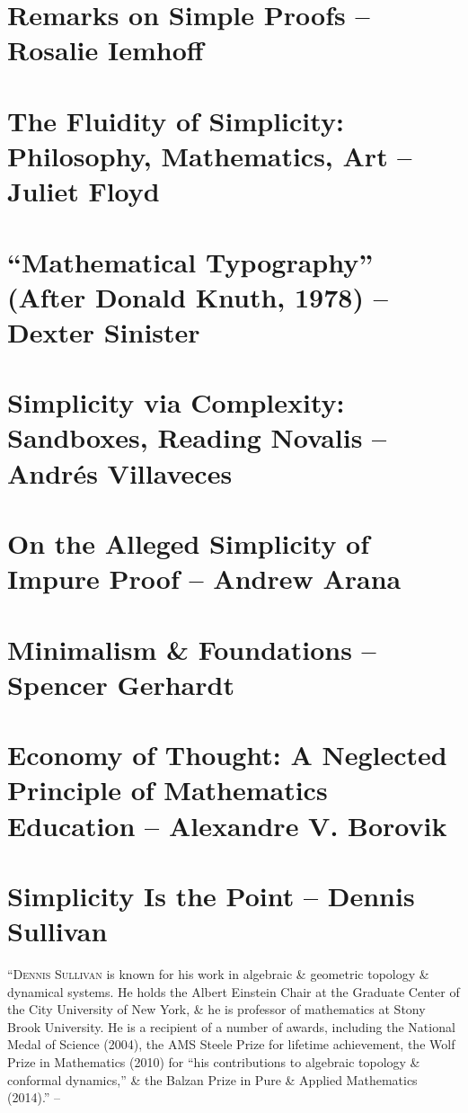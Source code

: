 \documentclass[oneside]{book}
\numberwithin{equation}{section}
\begin{document}
\section{Remarks on Simple Proofs -- Rosalie Iemhoff}

\section{The Fluidity of Simplicity: Philosophy, Mathematics, Art -- Juliet Floyd}

\section{``Mathematical Typography'' (After Donald Knuth, 1978) -- Dexter Sinister}

\section{Simplicity via Complexity: Sandboxes, Reading Novalis -- Andr\'es Villaveces}

\section{On the Alleged Simplicity of Impure Proof -- Andrew Arana}

\section{Minimalism \& Foundations -- Spencer Gerhardt}

\section{Economy of Thought: A Neglected Principle of Mathematics Education -- Alexandre V. Borovik}

\section{Simplicity Is the Point -- Dennis Sullivan}
``\textsc{Dennis Sullivan} is known for his work in algebraic \& geometric topology \& dynamical systems. He holds the Albert Einstein Chair at the Graduate Center of the City University of New York, \& he is professor of mathematics at Stony Brook University. He is a recipient of a number of awards, including the National Medal of Science (2004), the AMS Steele Prize for lifetime achievement, the Wolf Prize in Mathematics (2010) for ``his contributions to algebraic topology \& conformal dynamics,'' \& the Balzan Prize in Pure \& Applied Mathematics (2014).'' -- \cite[Contributors, p. xx ]{Kossak_Ording2017}
\end{document}
